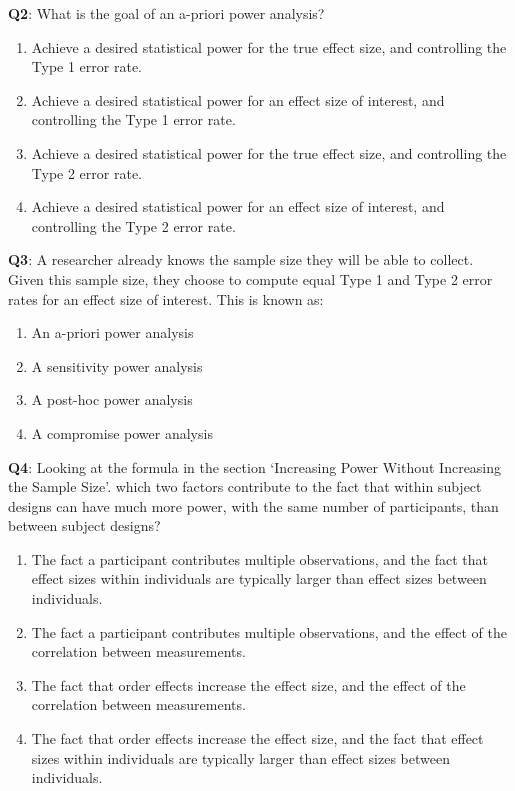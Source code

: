 \documentclass[
  oneside]{book}
\providecommand{\tightlist}{%
  \setlength{\itemsep}{0pt}\setlength{\parskip}{0pt}}
\begin{document}
\textbf{Q2}: What is the goal of an a-priori power analysis?

\begin{enumerate}
\def\labelenumi{\Alph{enumi})}
\tightlist
\item
  Achieve a desired statistical power for the true effect size, and controlling the Type 1 error rate.
\item
  Achieve a desired statistical power for an effect size of interest, and controlling the Type 1 error rate.
\item
  Achieve a desired statistical power for the true effect size, and controlling the Type 2 error rate.
\item
  Achieve a desired statistical power for an effect size of interest, and controlling the Type 2 error rate.
\end{enumerate}

\textbf{Q3}: A researcher already knows the sample size they will be able to collect. Given this sample size, they choose to compute equal Type 1 and Type 2 error rates for an effect size of interest. This is known as:

\begin{enumerate}
\def\labelenumi{\Alph{enumi})}
\tightlist
\item
  An a-priori power analysis
\item
  A sensitivity power analysis
\item
  A post-hoc power analysis
\item
  A compromise power analysis
\end{enumerate}

\textbf{Q4}: Looking at the formula in the section `Increasing Power Without Increasing the Sample Size'. which two factors contribute to the fact that within subject designs can have much more power, with the same number of participants, than between subject designs?

\begin{enumerate}
\def\labelenumi{\Alph{enumi})}
\tightlist
\item
  The fact a participant contributes multiple observations, and the fact that effect sizes within individuals are typically larger than effect sizes between individuals.
\item
  The fact a participant contributes multiple observations, and the effect of the correlation between measurements.
\item
  The fact that order effects increase the effect size, and the effect of the correlation between measurements.
\item
  The fact that order effects increase the effect size, and the fact that effect sizes within individuals are typically larger than effect sizes between individuals.
\end{enumerate}
\end{document}
